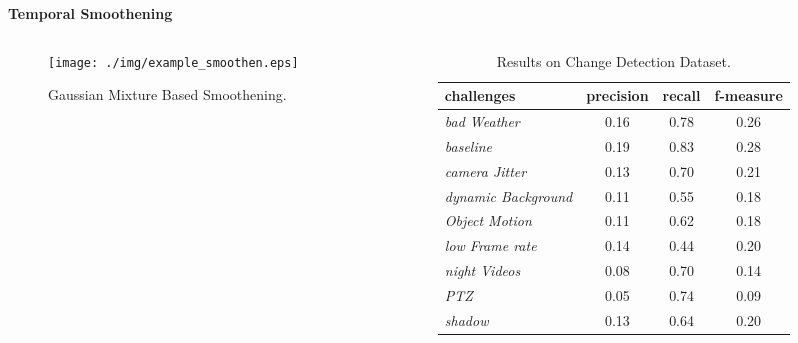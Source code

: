 \begin{frame}{\textbf{Temporal Smoothening}}
\begin{columns}
	\begin{column}{0.48\textwidth}
		\begin{figure}
			\centering
				\texttt{[image: ./img/example\_smoothen.eps]}
				\caption{Gaussian Mixture Based Smoothening.}
		\end{figure}
	\end{column}
	\begin{column}{0.48\textwidth}
	  \begin{table}[htbp]
   		\caption{Results on Change Detection Dataset.}
   		\begin{scriptsize} \begin{center}
   		\begin{tabular}{|l|c|c|c|} \hline
       		 \textbf{challenges} & \textbf{precision} & \textbf{recall} & \textbf{f-measure} \\ \hline
				\emph{bad Weather} & 0.16 & 0.78 & 0.26\\
				\emph{baseline} & 0.19 & {\color{yellow}0.83} & 0.28\\
				\emph{camera Jitter} & 0.13 & 0.70 & 0.21 \\
				\emph{dynamic Background} & 0.11 & 0.55 &  0.18\\
				\emph{Object Motion} & 0.11 & 0.62 & 0.18 \\
				\emph{low Frame rate} & 0.14 & 0.44 & 0.20 \\
				\emph{night Videos} & 0.08 & 0.70 & 0.14 \\
				\emph{PTZ }& 0.05 & 0.74 & 0.09\\
				\emph{shadow} & 0.13 & 0.64 & 0.20\\ \hline
 		\end{tabular} \end{center} \end{scriptsize}
 	 \end{table} 
	\end{column}
\end{columns}
\end{frame}

